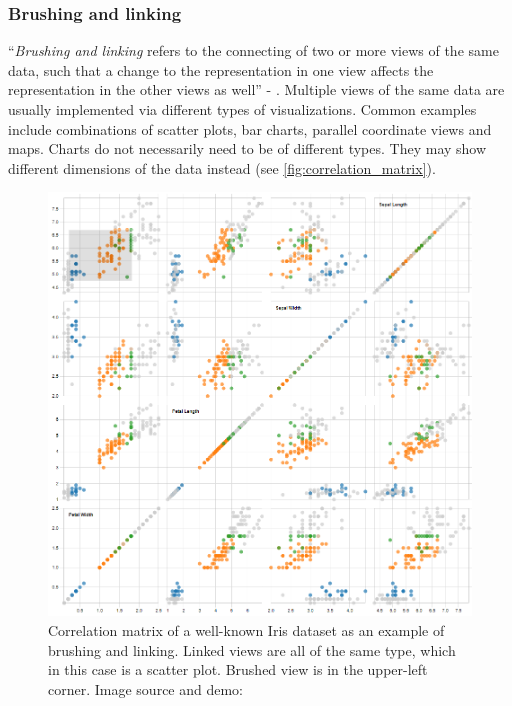 \subsubsection{Brushing and linking}
\label{subsubsec:brushing_and_linking}

``\textit{Brushing and linking} refers to the connecting of two or more views of the same data, such that a change to the representation in one view affects the representation in the other views as well''  - \cite{hearst1999modern}. 
Multiple views of the same data are usually implemented via different types of visualizations.
Common examples include combinations of scatter plots, bar charts, parallel coordinate views and maps.
Charts do not necessarily need to be of different types.
They may show different dimensions of the data instead (see \autoref{fig:correlation_matrix}).

\begin{figure}[!]
\centering
\includegraphics[width=\textwidth]{img/correlation_matrix}
\caption{Correlation matrix of a well-known Iris dataset as an example of brushing and linking. Linked views are all of the same type, which in this case is a scatter plot. Brushed view is in the upper-left corner. Image source and demo: \cite{Bostock2019a}}
\label{fig:correlation_matrix}
\end{figure}

